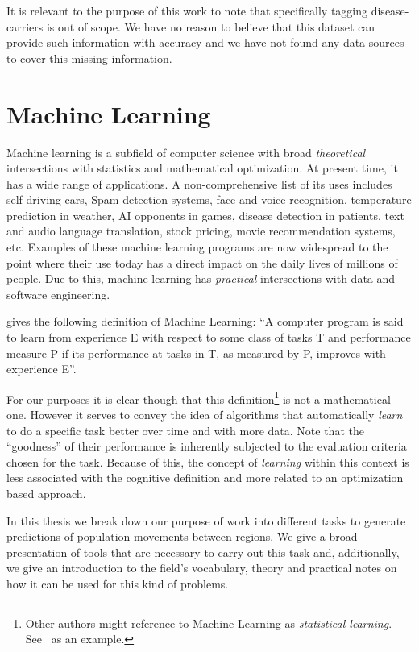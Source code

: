 It is relevant to the purpose of this work to note that specifically tagging disease-carriers is out of scope.
We have no reason to believe that this dataset can provide such information with accuracy and we have not found any data sources to cover this missing  information.

\section{Machine Learning}

Machine learning is a subfield of computer science with broad \textit{theoretical} intersections with statistics and mathematical optimization.
At present time, it has a wide range of applications.
A non-comprehensive list of its uses includes self-driving cars, Spam detection systems, face and voice recognition, temperature prediction in weather, AI opponents in games, disease detection in patients, text and audio language translation, stock pricing, movie recommendation systems, etc.
Examples of these machine learning programs are now widespread to the point where their use today has a direct impact on the daily lives of millions of people.
Due to this, machine learning has \textit{practical} intersections with data and software engineering.


\citep{Mitchell-MLearning} gives the following definition of Machine Learning:
``A computer program is said to learn from experience E with respect to some class of tasks T and performance measure P if its performance at tasks in T, as measured by P, improves with experience E''.

For our purposes it is clear though that this definition\footnote{Other authors might reference to Machine Learning as \textit{statistical learning}. See~\citep{hastie-elemstatslearn} as an example.} is not a mathematical one.
However it serves to convey the idea of algorithms that automatically \textit{learn} to do a specific task better over time and with more data.
Note that the ``goodness'' of their performance is inherently subjected to the evaluation criteria chosen for the task.
Because of this, the concept of \textit{learning} within this context is less associated with the cognitive definition and more related to an optimization based approach.

In this thesis we break down our purpose of work into different tasks to generate predictions of population movements between regions.
We give a broad presentation of tools that are necessary to carry out this task and, additionally, we give an introduction to the field's vocabulary, theory and practical notes on how it can be used for this kind of problems.

